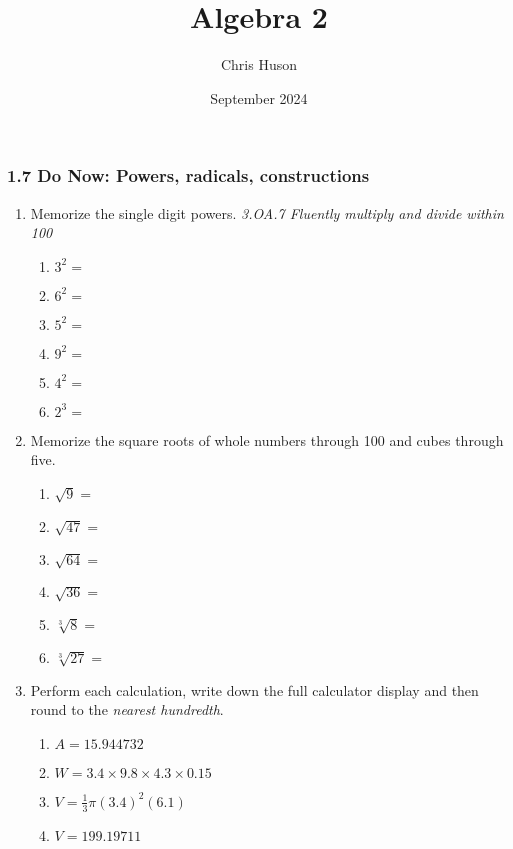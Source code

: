 \documentclass[12pt, twoside]{article}
\title{Algebra 2}
\author{Chris Huson}
\date{September 2024}
\begin{document}
\subsubsection*{1.7 Do Now: Powers, radicals, constructions}
\begin{enumerate}[itemsep=0.5cm]

\item Memorize the single digit powers. \hfill \emph{3.OA.7 Fluently multiply and divide within 100}
    \begin{multicols}{2}
        \begin{enumerate}[itemsep=0.5cm]
            \item $3^2 =$
            \item $6^2 =$
            \item $5^2 =$
            \item $9^2 =$
            \item $4^2 =$
            \item $2^3 =$
        \end{enumerate}
    \end{multicols}

\item Memorize the square roots of whole numbers through 100 and cubes through five.
    \begin{multicols}{2}
        \begin{enumerate}[itemsep=0.5cm]
            \item $\sqrt{9} =$
            \item $\sqrt{47} =$
            \item $\sqrt{64} =$
            \item $\sqrt{36} =$
            \item $\sqrt[3]{8} =$
            \item $\sqrt[3]{27} =$
          \end{enumerate}
    \end{multicols} \vspace{0.25cm}


\item Perform each calculation, write down the full calculator display and then round to the \emph{nearest hundredth}.
    \begin{multicols}{2}
    \begin{enumerate}[itemsep=1.5cm]
      \item $A=15.944732$
      \item $W=3.4 \times 9.8 \times 4.3 \times 0.15$
      \item $V=\frac{1}{3} \pi (3.4)^2(6.1)$
      \item $V=199.19711$
    \end{enumerate}
    \end{multicols} \vspace{1cm}


\end{enumerate}
\end{document}

